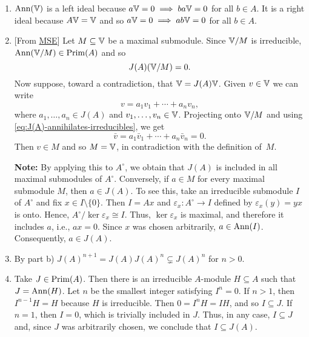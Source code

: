 \begin{solution}
    \begin{enumerate}[\rm a)]
        \item $\operatorname{\operatorname{Ann}}(\mathbb V)$ is a left ideal because $a\mathbb V=0\implies ba\mathbb V=0$ for all $b\in A$. It is a right ideal because $A\mathbb V=\mathbb V$ and so $a\mathbb V=0\implies ab\mathbb V=0$ for all $b\in A$.

        \item {[From \href{https://math.stackexchange.com/q/1571066/269050}{MSE}]} Let $M\subseteq\mathbb V$ be a maximal submodule. Since $\mathbb V/M$ is irreducible, $\operatorname{\operatorname{Ann}}(\mathbb V/M)\in\operatorname{Prim}(A)$ and so
        \begin{equation}\label{eq:J(A)-annihilates-irreducibles}
            J(A)(\mathbb V/M)=0.
        \end{equation}
        Now suppose, toward a contradiction, that $\mathbb V=J(A)\mathbb V$. Given $v\in\mathbb V$ we can write
        $$
            v = a_1v_1+\cdots+a_nv_n,
        $$
        where $a_1,\dots,a_n\in J(A)$ and $v_1,\dots,v_n\in\mathbb V$. Projecting onto $\mathbb V/M$ and using \eqref{eq:J(A)-annihilates-irreducibles}, we get
        $$
            \bar v = a_1\bar v_1+\cdots+a_n\bar v_n = 0.
        $$
        Then $v\in M$ and so $M=\mathbb V$, in contradiction with the definition of~$M$.

        \textbf{Note:} By applying this to $A^\circ$, we obtain that $J(A)$ is included in all maximal submodules of $A^\circ$. Conversely, if $a \in M$ for every maximal submodule $M$, then $a \in J(A)$. To see this, take an irreducible submodule $I$ of $A^\circ$ and fix $x \in I \setminus \{0\}$. Then $I = Ax$ and $\varepsilon_x\colon A^\circ \to I$ defined by $\varepsilon_x(y) = yx$ is onto. Hence, $A^\circ / \ker \varepsilon_x \cong I$. Thus, $\ker \varepsilon_x$ is maximal, and therefore it includes $a$, i.e., $ax = 0$. Since $x$ was chosen arbitrarily, $a \in \operatorname{\operatorname{Ann}}(I)$. Consequently, $a \in J(A)$.
        
        \item By part b) $J(A)^{n+1}=J(A)J(A)^n\varsubsetneq J(A)^n$ for $n>0$.

        \item Take $J\in\operatorname{Prim}(A)$. Then there is an irreducible $A$-module $H\subseteq A$ such that $J=\operatorname{\operatorname{Ann}}(H)$. Let $n$ be the smallest integer satisfying $I^n=0$. If $n>1$, then $I^{n-1}H=H$ because $H$ is irreducible. Then $0=I^nH=IH$, and so $I\subseteq J$. If $n=1$, then $I=0$, which is trivially included in $J$. Thus, in any case, $I\subseteq J$ and, since $J$ was arbitrarily chosen, we conclude that $I\subseteq J(A)$.\qedhere
    \end{enumerate}
\end{solution}


